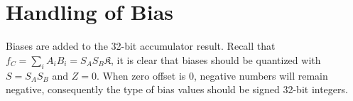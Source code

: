 \section{Handling of Bias}

Biases are added to the 32-bit accumulator result. Recall that $f_C = \sum_{i} A_i B_i = S_A S_B \mathfrak{K}$,
it is clear that biases should be quantized with $S = S_A S_B$ and $Z = 0$. When zero offset is $0$, negative
numbers will remain negative, consequently the type of bias values should be signed 32-bit integers.

\clearpage %
